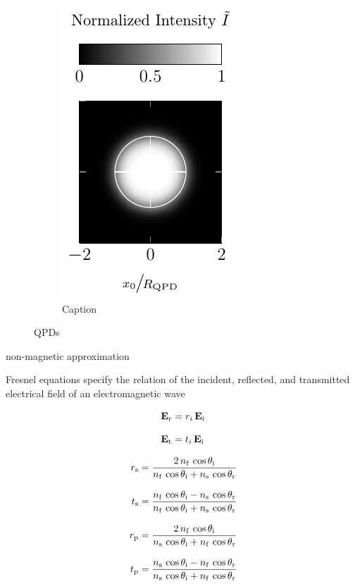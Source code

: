 \begin{figure}
\begin{subfigure}[b]{0.3\textwidth}
    \label{fig:Th-QPDy}
  \end{subfigure}
  \hfill
  \begin{subfigure}[b]{0.3\textwidth}
    \centering
    \includegraphics[]{Plots/cache/QPDt.pdf}
    \caption{Caption}
    \label{fig:Th-QPDt}
  \end{subfigure}
  \caption{QPDs}
  \label{fig:QPDs}
\end{figure}

\lipsum[1-2]

non-magnetic approximation

Fresnel equations specify the relation of the incident, reflected, and 
transmitted electrical field of an electromagnetic wave


\cite[Chapter 7]{Jackson2013}

\begin{subequations}
\begin{align}
  \vb{E}_{\mathrm{r}} & =r_{i}\,\vb{E}_{\mathrm{i}} \\[3mm]
  \vb{E}_{\mathrm{t}} & =t_{i}\,\vb{E}_{\mathrm{i}}
\end{align}
\end{subequations}

\cite[Chapter 7]{Jackson2013}

\begin{subequations}
\begin{align}
  r_{\mathrm{s}} & =
  \frac{2\,n_{\mathrm{f}}\,\cos\theta_{\mathrm{i}}}{n_{\mathrm{f}}\,\cos\theta_{\mathrm{i}} + n_{\mathrm{s}}\,\cos\theta_{\mathrm{r}}} 
  \label{eq:th-fresnel-rs}\\[3mm]
  t_{\mathrm{s}} & = \frac{n_{\mathrm{f}}\,\cos\theta_{\mathrm{i}} - 
  n_{\mathrm{s}}\,\cos\theta_{\mathrm{r}}}{n_{\mathrm{f}}\,\cos\theta_{\mathrm{i}} + n_{\mathrm{s}}\,\cos\theta_{\mathrm{r}}} 
  \label{eq:th-fresnel-ts}\\[3mm]
  r_{\mathrm{p}} & =
  \frac{2\,n_{\mathrm{f}}\,\cos\theta_{\mathrm{i}}}{n_{\mathrm{s}}\,\cos\theta_{\mathrm{i}} + n_{\mathrm{f}}\,\cos\theta_{\mathrm{r}}} 
  \label{eq:th-fresnel-rp}\\[3mm]
  t_{\mathrm{p}} & = \frac{n_{\mathrm{s}}\,\cos\theta_{\mathrm{i}} - 
  n_{\mathrm{f}}\,\cos\theta_{\mathrm{r}}}{n_{\mathrm{s}}\,\cos\theta_{\mathrm{i}} + n_{\mathrm{f}}\,\cos\theta_{\mathrm{r}}}
\label{eq:th-fresnel-tp}
\end{align}
\end{subequations}

